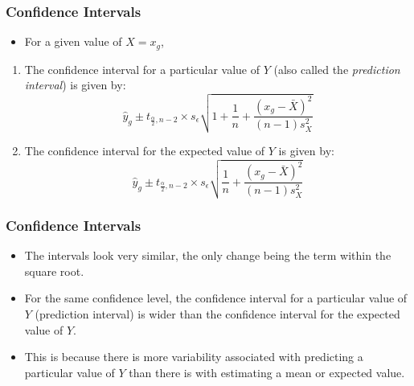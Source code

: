 \documentclass[12pt]{beamer}
\begin{document}
\begin{frame}
	\frametitle{Confidence Intervals}
	
	\begin{itemize}[label={\color{blue}$\blacktriangleright$}]
		\item For a given value of $X = x_g$,
	\end{itemize}
	
	\begin{enumerate}[label=\textcolor{blue}{\arabic*.}]
		\item The confidence interval for a particular value of $Y$ (also called the \emph{prediction interval}) is given by:
		\[
		\hat{y}_g \pm t_{\frac{\alpha}{2},n-2} \times s_\epsilon\sqrt{1 + \frac{1}{n} + \frac{(x_g - \bar{X})^2}{(n-1)s_X^2}}
		\]
		
		\item The confidence interval for the expected value of $Y$ is given by:
		\[
		\hat{y}_g \pm t_{\frac{\alpha}{2},n-2} \times s_\epsilon\sqrt{\frac{1}{n} + \frac{(x_g - \bar{X})^2}{(n-1)s_X^2}}
		\]
	\end{enumerate}
\end{frame}
\begin{frame}
	\frametitle{Confidence Intervals}
	
	\begin{itemize}[label={\color{blue}$\blacktriangleright$}]
		\item The intervals look very similar, the only change being the term within the square root.
		
		\item For the same confidence level, the confidence interval for a particular value of $Y$ (prediction interval) is wider than the confidence interval for the expected value of $Y$.
		
		\item This is because there is more variability associated with predicting a particular value of $Y$ than there is with estimating a mean or expected value.
	\end{itemize}
\end{frame}
\end{document}
